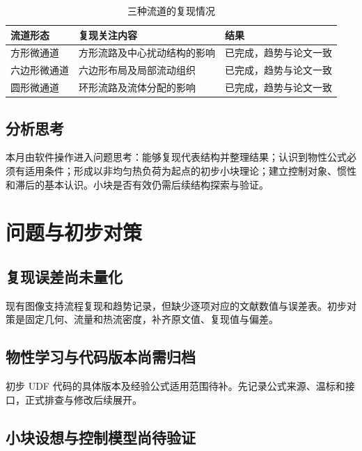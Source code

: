 \documentclass[stage1,fontset=fandol]{ydzjreport}
\begin{document}
	\begin{table}[H]
		\centering
		\caption{三种流道的复现情况}
		\label{tab:repro}
		\begin{tabularx}{\textwidth}{@{}Y Y Y@{}}
			\toprule
{} 流道形态 & 复现关注内容 & 结果 \\
			\midrule
			方形微通道 & 方形流路及中心扰动结构的影响 & 已完成，趋势与论文一致 \\
			六边形微通道 & 六边形布局及局部流动组织 & 已完成，趋势与论文一致 \\
			圆形微通道 & 环形流路及流体分配的影响 & 已完成，趋势与论文一致 \\

			\bottomrule
		\end{tabularx}
	\end{table}



\subsection{分析思考}

本月由软件操作进入问题思考：能够复现代表结构并整理结果；认识到物性公式必须有适用条件；形成以非均匀热负荷为起点的初步小块理论；建立控制对象、惯性和滞后的基本认识。小块是否有效仍需后续结构探索与验证。

\section{问题与初步对策}

\subsection{复现误差尚未量化}

现有图像支持流程复现和趋势记录，但缺少逐项对应的文献数值与误差表。初步对策是固定几何、流量和热流密度，补齐原文值、复现值与偏差。

\subsection{物性学习与代码版本尚需归档}

初步 UDF 代码的具体版本及经验公式适用范围待补。先记录公式来源、温标和接口，正式排查与修改后续展开。

\subsection{小块设想与控制模型尚待验证}
\end{document}
